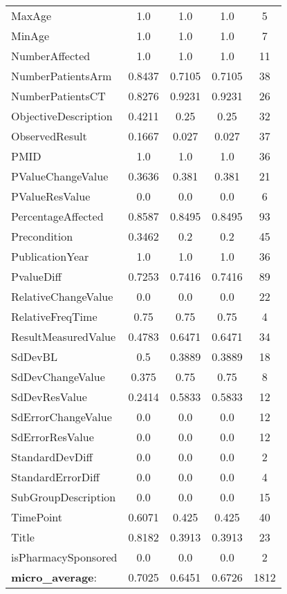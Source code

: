 \begin{longtable}{ l c c c c}
MaxAge & 1.0 & 1.0 & 1.0 & 5\\
MinAge & 1.0 & 1.0 & 1.0 & 7\\
NumberAffected & 1.0 & 1.0 & 1.0 & 11\\
NumberPatientsArm & 0.8437 & 0.7105 & 0.7105 & 38\\
NumberPatientsCT & 0.8276 & 0.9231 & 0.9231 & 26\\
ObjectiveDescription & 0.4211 & 0.25 & 0.25 & 32\\
ObservedResult & 0.1667 & 0.027 & 0.027 & 37\\
PMID & 1.0 & 1.0 & 1.0 & 36\\
PValueChangeValue & 0.3636 & 0.381 & 0.381 & 21\\
PValueResValue & 0.0 & 0.0 & 0.0 & 6\\
PercentageAffected & 0.8587 & 0.8495 & 0.8495 & 93\\
Precondition & 0.3462 & 0.2 & 0.2 & 45\\
PublicationYear & 1.0 & 1.0 & 1.0 & 36\\
PvalueDiff & 0.7253 & 0.7416 & 0.7416 & 89\\
RelativeChangeValue & 0.0 & 0.0 & 0.0 & 22\\
RelativeFreqTime & 0.75 & 0.75 & 0.75 & 4\\
ResultMeasuredValue & 0.4783 & 0.6471 & 0.6471 & 34\\
SdDevBL & 0.5 & 0.3889 & 0.3889 & 18\\
SdDevChangeValue & 0.375 & 0.75 & 0.75 & 8\\
SdDevResValue & 0.2414 & 0.5833 & 0.5833 & 12\\
SdErrorChangeValue & 0.0 & 0.0 & 0.0 & 12\\
SdErrorResValue & 0.0 & 0.0 & 0.0 & 12\\
StandardDevDiff & 0.0 & 0.0 & 0.0 & 2\\
StandardErrorDiff & 0.0 & 0.0 & 0.0 & 4\\
SubGroupDescription & 0.0 & 0.0 & 0.0 & 15\\
TimePoint & 0.6071 & 0.425 & 0.425 & 40\\
Title & 0.8182 & 0.3913 & 0.3913 & 23\\
isPharmacySponsored & 0.0 & 0.0 & 0.0 & 2\\
\textbf{micro\_average}: & 0.7025 & 0.6451 & 0.6726 & 1812 
\label{tab:Diabetes_eventextr}
\end{longtable}
